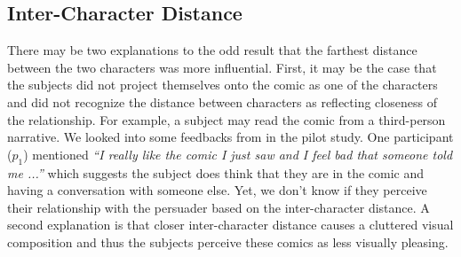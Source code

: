 \subsection{Inter-Character Distance}
\label{sub:Inter-Character Distance}
There may be two explanations to the odd result that the farthest distance between the two characters was more influential.
First, it may be the case that the subjects did not project themselves onto the comic as one of the characters and did not recognize the distance between characters as reflecting closeness of the relationship. For example, a subject may read the comic from a third-person narrative. We looked into some feedbacks from in the pilot study. One participant ($p_1$) mentioned \textit{``I really like the comic I just saw and I feel bad that someone told me ...''} which suggests the subject does think that they are in the comic and having a conversation with someone else. Yet, we don't know if they perceive their relationship with the persuader based on the inter-character distance. A second explanation is that closer inter-character distance causes a cluttered visual composition and thus the subjects perceive these comics as less visually pleasing.

